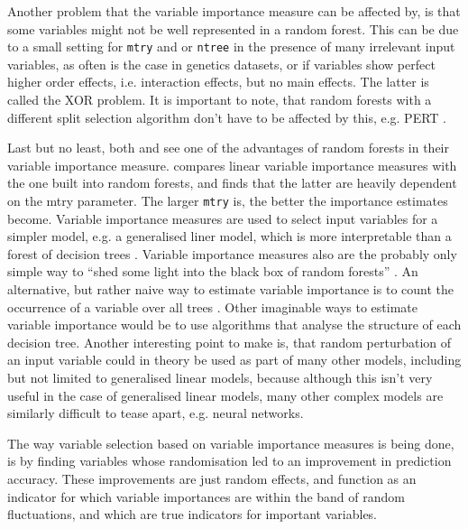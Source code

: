 \documentclass[a4paper,man,12pt,apacite,floatsintext,draftfirst]{apa6} %
\begin{document}
Another problem that the variable importance measure can be affected by,
is that some variables might not be well represented in a random forest.
This can be due to a small setting for \texttt{mtry} and or \texttt{ntree}
in the presence of many irrelevant input variables, as often is the case
in genetics datasets, or if variables show perfect higher order effects,
i.e. interaction effects, but no main effects.
The latter is called the XOR problem.
It is important to note, that random forests with a different split selection
algorithm don't have to be affected by this, e.g. PERT \cite{cutler2001pert}.

Last but no least, both  and
 see one of the advantages of random forests in
their variable importance measure.
\cite{gromping2009variable} compares linear variable importance measures
with the one built into random forests, and finds that the latter are
heavily dependent on the mtry parameter.
The larger \texttt{mtry} is, the better the importance estimates become.
Variable importance measures are used to select input variables for a simpler
model, e.g. a generalised liner model, which is more interpretable than a
forest of decision trees \cite{strobl2009introduction}.
Variable importance measures also are the probably only simple way to
“shed some light into the black box of random forests”
\cite{gromping2009variable}.
An alternative, but rather naive way to estimate variable importance is to count
the occurrence of a variable over all trees \cite{strobl2009introduction}.
Other imaginable ways to estimate variable importance would be to use
algorithms that analyse the structure of each decision tree.
Another interesting point to make is, that random perturbation of an input
variable could in theory be used as part of many other models, including but
not limited to generalised linear models, because although
this isn't very useful in the case of generalised linear models,
many other complex models are similarly difficult to tease apart, e.g.
neural networks.

The way variable selection based on variable importance measures is
being done, is by finding variables whose randomisation led to an improvement
in prediction accuracy.
These improvements are just random effects, and function as an indicator
for which variable importances are within the band of random fluctuations,
and which are true indicators for important variables.
\end{document}
